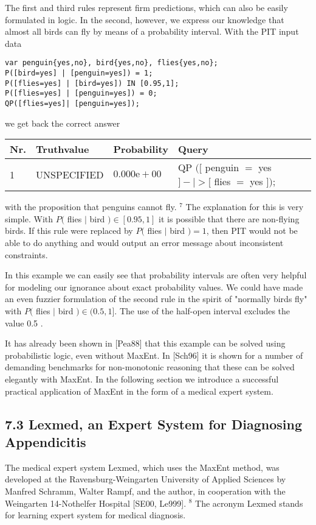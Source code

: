 \documentclass[10pt]{article}
\begin{document}
The first and third rules represent firm predictions, which can also be easily formulated in logic. In the second, however, we express our knowledge that almost all birds can fly by means of a probability interval. With the PIT input data

\begin{verbatim}
var penguin{yes,no}, bird{yes,no}, flies{yes,no};
P([bird=yes] | [penguin=yes]) = 1;
P([flies=yes] | [bird=yes]) IN [0.95,1];
P([flies=yes] | [penguin=yes]) = 0;
QP([flies=yes]| [penguin=yes]);
\end{verbatim}

we get back the correct answer

\begin{center}
\begin{tabular}{llll}
\hline
Nr. & Truthvalue & Probability & Query \\
\hline
1 & UNSPECIFIED & $0.000 \mathrm{e}+00$ & QP $([$ penguin $=$ yes $]-\mid>[$ flies $=$ yes $]) ;$ \\
\hline
\end{tabular}
\end{center}

with the proposition that penguins cannot fly. ${ }^{7}$ The explanation for this is very simple. With $P($ flies $\mid$ bird $) \in[0.95,1]$ it is possible that there are non-flying birds. If this rule were replaced by $P($ flies $\mid$ bird $)=1$, then PIT would not be able to do anything and would output an error message about inconsistent constraints.

In this example we can easily see that probability intervals are often very helpful for modeling our ignorance about exact probability values. We could have made an even fuzzier formulation of the second rule in the spirit of "normally birds fly" with $P($ flies $\mid$ bird $) \in(0.5,1]$. The use of the half-open interval excludes the value 0.5 .

It has already been shown in [Pea88] that this example can be solved using probabilistic logic, even without MaxEnt. In [Sch96] it is shown for a number of demanding benchmarks for non-monotonic reasoning that these can be solved elegantly with MaxEnt. In the following section we introduce a successful practical application of MaxEnt in the form of a medical expert system.

\subsection*{7.3 Lexmed, an Expert System for Diagnosing Appendicitis}
The medical expert system Lexmed, which uses the MaxEnt method, was developed at the Ravensburg-Weingarten University of Applied Sciences by Manfred Schramm, Walter Rampf, and the author, in cooperation with the Weingarten 14-Nothelfer Hospital [SE00, Le999]. ${ }^{8}$ The acronym Lexmed stands for learning expert system for medical diagnosis.
\end{document}
